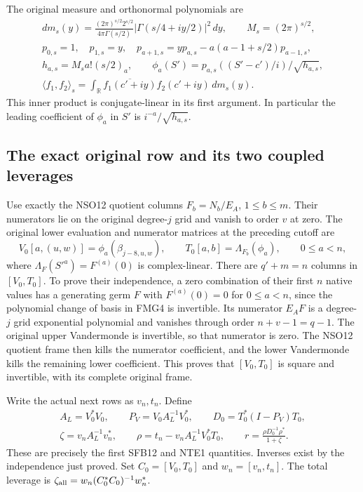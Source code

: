 \documentclass[11pt,a4paper]{article}
\begin{document}
The original measure and orthonormal polynomials are
\[
\begin{gathered}
 dm_s(y)=\frac{(2\pi)^{s/2}2^{s/2}}{4\pi\Gamma(s/2)}
       |\Gamma(s/4+iy/2)|^2\,dy,\qquad M_s=(2\pi)^{s/2},\\
 p_{0,s}=1,\quad p_{1,s}=y,\quad
 p_{a+1,s}=yp_{a,s}-a(a-1+s/2)p_{a-1,s},\\
 h_{a,s}=M_sa!(s/2)_a,\qquad
 \phi_a(S')=p_{a,s}((S'-c')/i)/\sqrt{h_{a,s}},\\
 \langle f_1,f_2\rangle_s=
  \int_{\mathbb R}\overline{f_1(c'+iy)}f_2(c'+iy)\,dm_s(y).
\end{gathered}                                                   \tag{FMG4}
\]
This inner product is conjugate-linear in its first argument.
In particular the leading coefficient of $\phi_a$ in $S'$ is
$i^{-a}/\sqrt{h_{a,s}}$.

\subsection{The exact original row and its two coupled leverages}
Use exactly the NSO12 quotient columns $F_b=N_b/E_A$, $1\le b\le m$.
Their numerators lie on the original degree-$j$ grid and vanish to
order $v$ at zero. The original lower evaluation and numerator
matrices at the preceding cutoff are
\[
 V_0[a,(u,w)]=\phi_a(\beta_{j-8,u,w}),\qquad
 T_0[a,b]=\Lambda_{F_b}(\phi_a),\qquad 0\le a<n,
                                                               \tag{FMG5}
\]
where $\Lambda_F(S'^a)=F^{(a)}(0)$ is complex-linear. There are
$q'+m=n$ columns in $[V_0,T_0]$. To prove their independence,
a zero combination of their first $n$ native values has a generating
germ $F$ with $F^{(a)}(0)=0$ for $0\le a<n$, since the polynomial
change of basis in FMG4 is invertible. Its numerator $E_AF$ is
a degree-$j$ grid exponential polynomial and vanishes through
order $n+v-1=q-1$. The original upper Vandermonde is invertible,
so that numerator is zero. The NSO12 quotient frame then kills
the numerator coefficient, and the lower Vandermonde kills the
remaining lower coefficient. This proves that $[V_0,T_0]$ is
square and invertible, with its complete original frame.

Write the actual next rows as $v_n,t_n$. Define
\[
\begin{gathered}
 A_L=V_0^*V_0,\qquad P_V=V_0A_L^{-1}V_0^*,\qquad
 D_0=T_0^*(I-P_V)T_0,\\
 \zeta=v_nA_L^{-1}v_n^*,\qquad
 \rho=t_n-v_nA_L^{-1}V_0^*T_0,\qquad
 r=\frac{\rho D_0^{-1}\rho^*}{1+\zeta}.
\end{gathered}                                                   \tag{FMG6}
\]
These are precisely the first SFB12 and NTE1 quantities. Inverses
exist by the independence just proved. Set
$C_0=[V_0,T_0]$ and $w_n=[v_n,t_n]$. The total leverage is
$\zeta_{\rm all}=w_n(C_0^*C_0)^{-1}w_n^*$.
\end{document}
